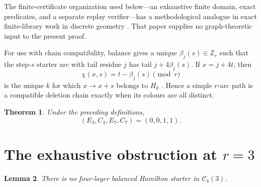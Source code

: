 \documentclass[11pt]{article}
\newtheorem{theorem}{Theorem}
\newtheorem{lemma}[theorem]{Lemma}
\newcommand{\Z}{\mathbb Z}
\begin{document}
The finite-certificate organization used below---an exhaustive finite domain,
exact predicates, and a separate replay verifier---has a methodological
analogue in exact finite-library work in discrete geometry
\cite{ZengEtAl2026ExactFinite}.  That paper supplies no graph-theoretic input
to the present proof.

For use with chain compatibility, balance gives a unique
\(\beta_j(s)\in\Z_r\) such that the step-\(s\) starter arc with tail residue
\(j\) has tail \(j+4\beta_j(s)\).  If \(x=j+4t\), then
\begin{equation}\label{eq:colour}
  \chi(x,s)=t-\beta_j(s)\pmod r
\end{equation}
is the unique \(k\) for which \(x\to x+s\) belongs to \(H_k\)
\cite[Lemma~5.2]{JiangYang2026}.  Hence a simple \(r\)-arc path is a
compatible deletion chain exactly when its colours are all distinct.

\begin{theorem}\label{thm:main}
Under the preceding definitions,
\[
  (E_3,C_3,E_7,C_7)=(0,0,1,1).
\]
\end{theorem}

\section{The exhaustive obstruction at \texorpdfstring{\(r=3\)}{r=3}}

\begin{lemma}\label{lem:r3}
There is no four-layer balanced Hamilton starter in \(\mathcal C_4(3)\).
\end{lemma}
\end{document}
